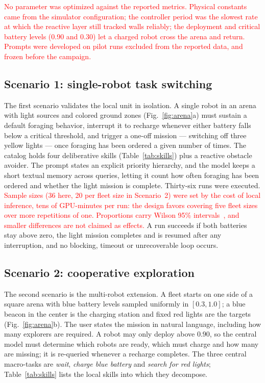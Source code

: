 \documentclass[conference]{IEEEtran}
\newif\ifrevmarks\revmarkstrue
\newcommand{\rev}[1]{\ifrevmarks\textcolor{red}{#1}\else#1\fi}
\begin{document}
\rev{No parameter was optimized against the reported metrics. Physical
constants came from the simulator configuration; the controller period
was the slowest rate at which the reactive layer still tracked walls
reliably; the deployment and critical battery levels (0.90 and 0.30) let
a charged robot cross the arena and return. Prompts were developed on
pilot runs excluded from the reported data, and frozen before the
campaign.}

\subsection{Scenario 1: single-robot task switching}

The first scenario validates the local unit in isolation. A single robot
in an arena with light sources and colored ground zones
(Fig.~\ref{fig:arena}a) must sustain a default foraging behavior,
interrupt it to recharge whenever either battery falls below a critical
threshold, and trigger a one-off mission --- switching off three yellow
lights --- once foraging has been ordered a given number of times. The
catalog holds four deliberative skills (Table~\ref{tab:skills}) plus a
reactive obstacle avoider. The prompt states an explicit priority
hierarchy, and the model keeps a short textual memory across queries,
letting it count how often foraging has been ordered and whether the
light mission is complete. Thirty-six runs were executed. \rev{Sample sizes (36 here, 20 per fleet size in
Scenario~2) were set by the cost of local inference, tens of GPU-minutes
per run: the design favors covering five fleet sizes over more
repetitions of one. Proportions carry Wilson 95\%
intervals~\cite{wilson1927}, and smaller differences are not claimed as
effects.} A run succeeds if both batteries stay above zero, the light mission
completes and is resumed after any interruption, and no blocking, timeout
or unrecoverable loop occurs.

\subsection{Scenario 2: cooperative exploration}

The second scenario is the multi-robot extension. A fleet starts on one
side of a square arena with blue battery levels sampled uniformly in
$[0.3, 1.0]$; a blue beacon in the center is the charging station and
fixed red lights are the targets (Fig.~\ref{fig:arena}b). The user states
the mission in natural language, including how many explorers are
required. A robot may only deploy above $0.90$, so the central model must
determine which robots are ready, which must charge and how many are
missing; it is re-queried whenever a recharge completes. The three
central macro-tasks are \emph{wait}, \emph{charge blue battery} and
\emph{search for red lights}; Table~\ref{tab:skills} lists the local
skills into which they decompose.
\end{document}
